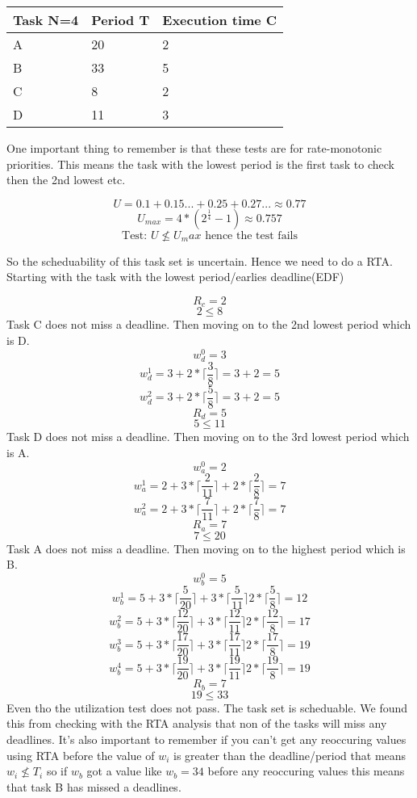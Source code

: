\begin{center}
    \begin{tabular}{ | l | l | l |}
    \hline
    Task N=4 & Period T & Execution time C \\ \hline
    A & 20  & 2 \\ \hline
    B & 33 & 5 \\ \hline
    C & 8 & 2 \\ \hline
    D & 11 & 3 \\ \hline
    \end{tabular}
\end{center}

One important thing to remember is that these tests are for rate-monotonic priorities. This means the task with the lowest period is the first task to check then the 2nd lowest etc.

$$ U = 0.1 + 0.15...+ 0.25 + 0.27...\approx 0.77 $$
$$ U_{max} = 4*(2^{\frac{1}{4}} - 1) \approx 0.757 $$
$$ \text{Test: } U \nleq U_max \text{ hence the test fails} $$\newline

So the scheduability of this task set is uncertain. Hence we need to do a RTA. Starting with the task with the lowest period/earlies deadline(EDF)

$$ R_c = 2 $$
$$ 2 \leq 8 $$
\newline Task C does not miss a deadline. Then moving on to the 2nd lowest period which is D.
$$ w_d^0 = 3  $$
$$ w_d^1 = 3 +  2 * \lceil \frac{3}{8} \rceil = 3+2 = 5 $$
$$ w_d^2 = 3 +  2 * \lceil \frac{5}{8} \rceil = 3 + 2 = 5 $$
$$ R_d = 5 $$
$$ 5 \leq 11 $$
\newline Task D does not miss a deadline. Then moving on to the 3rd lowest period which is A.
$$ w_a^0 = 2  $$
$$ w_a^1 = 2 + 3 * \lceil \frac{2}{11} \rceil + 2 * \lceil \frac{2}{8} \rceil = 7 $$
$$ w_a^2 = 2 + 3 * \lceil \frac{7}{11} \rceil + 2 * \lceil \frac{7}{8} \rceil   = 7 $$
$$ R_a = 7 $$
$$ 7 \leq 20 $$
\newline Task A does not miss a deadline. Then moving on to the highest period which is B.
$$ w_b^0 = 5  $$
$$ w_b^1 = 5 + 3 * \lceil \frac{5}{20} \rceil + 3 * \lceil \frac{5}{11} \rceil 2 * \lceil \frac{5}{8} \rceil = 12 $$
$$ w_b^2 = 5 + 3 * \lceil \frac{12}{20} \rceil + 3 * \lceil \frac{12}{11} \rceil 2 * \lceil \frac{12}{8} \rceil = 17 $$
$$ w_b^3 =5 + 3 * \lceil \frac{17}{20} \rceil + 3 * \lceil \frac{17}{11} \rceil 2 * \lceil \frac{17}{8} \rceil  = 19 $$
$$ w_b^4 = 5 + 3 * \lceil \frac{19}{20} \rceil + 3 * \lceil \frac{19}{11} \rceil 2 * \lceil \frac{19}{8} \rceil = 19 $$
$$ R_b = 7 $$
$$ 19 \leq 33 $$
\newline Even tho the utilization test does not pass. The task set is scheduable. We found this from checking with the RTA analysis that non of the tasks will miss any deadlines. It's also important to remember if you can't get any reoccuring values using RTA before the value of $w_i$ is greater than the deadline/period that means $w_i \nleq T_i $ so if $ w_b$ got a value like $w_b = 34$ before any reoccuring values this means that task B has missed a deadlines.

